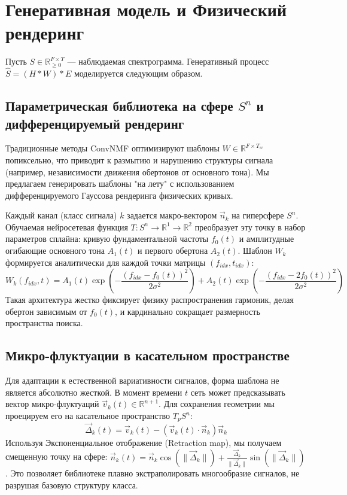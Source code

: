 \documentclass[11pt,a4paper]{article}
\begin{document}
\section{Генеративная модель и Физический рендеринг}

Пусть $S \in \mathbb{R}_{\ge 0}^{F \times T}$ — наблюдаемая спектрограмма. Генеративный процесс $\hat{S} = (H * W) * E$ моделируется следующим образом.

\subsection{Параметрическая библиотека на сфере $S^n$ и дифференцируемый рендеринг}
Традиционные методы ConvNMF оптимизируют шаблоны $W \in \mathbb{R}^{F \times T_w}$ попиксельно, что приводит к размытию и нарушению структуры сигнала (например, независимости движения обертонов от основного тона). Мы предлагаем генерировать шаблоны "на лету" с использованием дифференцируемого Гауссова рендеринга физических кривых.

Каждый канал (класс сигнала) $k$ задается макро-вектором $\vec{n}_k$ на гиперсфере $S^n$. Обучаемая нейросетевая функция $T: S^n \to \mathbb{R}^1 \to \mathbb{R}^2$ преобразует эту точку в набор параметров сплайна: кривую фундаментальной частоты $f_0(t)$ и амплитудные огибающие основного тона $A_1(t)$ и первого обертона $A_2(t)$.
Шаблон $W_k$ формируется аналитически для каждой точки матрицы $(f_{idx}, t_{idx})$:
\begin{equation}
W_k(f_{idx}, t) = A_1(t) \exp\left( - \frac{(f_{idx} - f_0(t))^2}{2\sigma^2} \right) + A_2(t) \exp\left( - \frac{(f_{idx} - 2f_0(t))^2}{2\sigma^2} \right)
\end{equation}
Такая архитектура жестко фиксирует физику распространения гармоник, делая обертон зависимым от $f_0(t)$, и кардинально сокращает размерность пространства поиска.

\subsection{Микро-флуктуации в касательном пространстве}
Для адаптации к естественной вариативности сигналов, форма шаблона не является абсолютно жесткой. В момент времени $t$ сеть может предсказывать вектор микро-флуктуаций $\vec{v}_k(t) \in \mathbb{R}^{n+1}$. Для сохранения геометрии мы проецируем его на касательное пространство $T_p S^n$:
\begin{equation}
\vec{\Delta}_k(t) = \vec{v}_k(t) - (\vec{v}_k(t) \cdot \vec{n}_k)\vec{n}_k
\end{equation}
Используя Экспоненциальное отображение (Retraction map), мы получаем смещенную точку на сфере: $\vec{n}_k(t) = \vec{n}_k \cos(\|\vec{\Delta}_k\|) + \frac{\vec{\Delta}_k}{\|\vec{\Delta}_k\|} \sin(\|\vec{\Delta}_k\|)$. Это позволяет библиотеке плавно экстраполировать многообразие сигналов, не разрушая базовую структуру класса.
\end{document}
